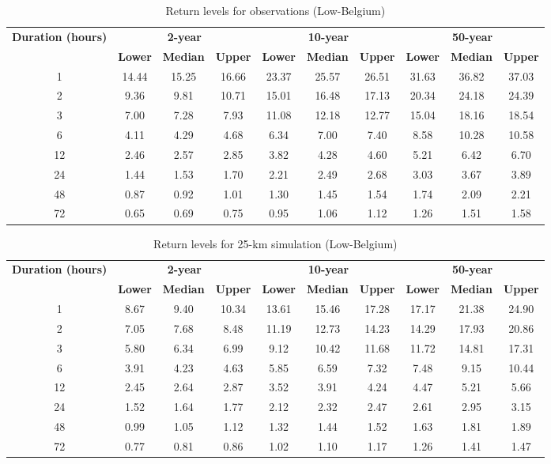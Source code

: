 
\begin{table}[p]
\centering
\caption{Return levels for observations (Low-Belgium)}
\label{tab:observations}
\begin{tabular}{c||ccc||ccc||ccc}
\hline
\textbf{Duration (hours)} & \multicolumn{3}{c||}{\textbf{2-year}} & \multicolumn{3}{c||}{\textbf{10-year}} & \multicolumn{3}{c}{\textbf{50-year}} \\
\cline{2-10}
& \textbf{Lower} & \textbf{Median} & \textbf{Upper} & \textbf{Lower} & \textbf{Median} & \textbf{Upper} & \textbf{Lower} & \textbf{Median} & \textbf{Upper} \\
\hline
1 & 14.44 & 15.25 & 16.66 & 23.37 & 25.57 & 26.51 & 31.63 & 36.82 & 37.03 \\
2 & 9.36 & 9.81 & 10.71 & 15.01 & 16.48 & 17.13 & 20.34 & 24.18 & 24.39 \\
3 & 7.00 & 7.28 & 7.93 & 11.08 & 12.18 & 12.77 & 15.04 & 18.16 & 18.54 \\
6 & 4.11 & 4.29 & 4.68 & 6.34 & 7.00 & 7.40 & 8.58 & 10.28 & 10.58 \\
12 & 2.46 & 2.57 & 2.85 & 3.82 & 4.28 & 4.60 & 5.21 & 6.42 & 6.70 \\
24 & 1.44 & 1.53 & 1.70 & 2.21 & 2.49 & 2.68 & 3.03 & 3.67 & 3.89 \\
48 & 0.87 & 0.92 & 1.01 & 1.30 & 1.45 & 1.54 & 1.74 & 2.09 & 2.21 \\
72 & 0.65 & 0.69 & 0.75 & 0.95 & 1.06 & 1.12 & 1.26 & 1.51 & 1.58 \\
\hline
\end{tabular}
\end{table}

\begin{table}[p]
\centering
\caption{Return levels for 25-km simulation (Low-Belgium)}
\label{tab:observations}
\begin{tabular}{c||ccc||ccc||ccc}
\hline
\textbf{Duration (hours)} & \multicolumn{3}{c||}{\textbf{2-year}} & \multicolumn{3}{c||}{\textbf{10-year}} & \multicolumn{3}{c}{\textbf{50-year}} \\
\cline{2-10}
& \textbf{Lower} & \textbf{Median} & \textbf{Upper} & \textbf{Lower} & \textbf{Median} & \textbf{Upper} & \textbf{Lower} & \textbf{Median} & \textbf{Upper} \\
\hline
1 & 8.67 & 9.40 & 10.34 & 13.61 & 15.46 & 17.28 & 17.17 & 21.38 & 24.90 \\
2 & 7.05 & 7.68 & 8.48 & 11.19 & 12.73 & 14.23 & 14.29 & 17.93 & 20.86 \\
3 & 5.80 & 6.34 & 6.99 & 9.12 & 10.42 & 11.68 & 11.72 & 14.81 & 17.31 \\
6 & 3.91 & 4.23 & 4.63 & 5.85 & 6.59 & 7.32 & 7.48 & 9.15 & 10.44 \\
12 & 2.45 & 2.64 & 2.87 & 3.52 & 3.91 & 4.24 & 4.47 & 5.21 & 5.66 \\
24 & 1.52 & 1.64 & 1.77 & 2.12 & 2.32 & 2.47 & 2.61 & 2.95 & 3.15 \\
48 & 0.99 & 1.05 & 1.12 & 1.32 & 1.44 & 1.52 & 1.63 & 1.81 & 1.89 \\
72 & 0.77 & 0.81 & 0.86 & 1.02 & 1.10 & 1.17 & 1.26 & 1.41 & 1.47 \\
\hline
\end{tabular}
\end{table}


